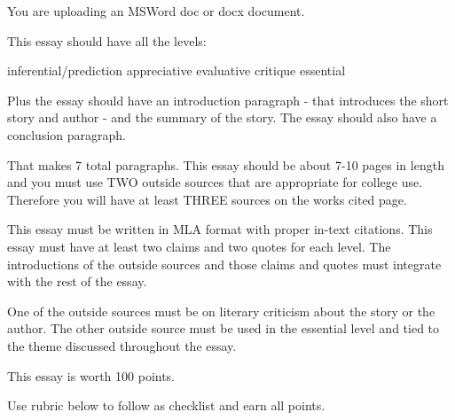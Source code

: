 You are uploading an MSWord doc or docx document. 

This essay should have all the levels:

    inferential/prediction
    appreciative
    evaluative
    critique
    essential

Plus the essay should have an introduction paragraph - that introduces the short story and author - and the summary of the story.  The essay should also have a conclusion paragraph.

That makes 7 total paragraphs.  This essay should be about 7-10 pages in length and you must use TWO outside sources that are appropriate for college use. Therefore you will have at least THREE sources on the works cited page.

This essay must be written in MLA format with proper in-text citations.  This essay must have at least two claims and two quotes for each level.  The introductions of the outside sources and those claims and quotes must integrate with the rest of the essay.

One of the outside sources must be on literary criticism about the story or the author.  The other outside source must be used in the essential level and tied to the theme discussed throughout the essay.

This essay is worth 100 points.

Use rubric below to follow as checklist and earn all points.

